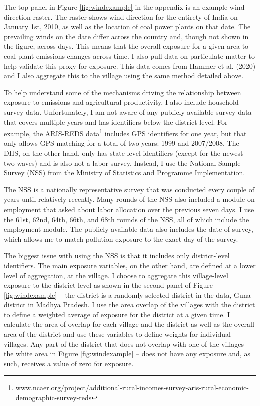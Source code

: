 \documentclass[
]{article}
\begin{document}
The top panel in Figure \ref{fig:windexample} in the appendix is an example wind direction raster. The raster shows wind direction for the entirety of India on January 1st, 2010, as well as the location of coal power plants on that date. The prevailing winds on the date differ across the country and, though not shown in the figure, across days. This means that the overall exposure for a given area to coal plant emissions changes across time. I also pull data on particulate matter to help validate this proxy for exposure. This data comes from Hammer et al. (2020) and I also aggregate this to the village using the same method detailed above.

To help understand some of the mechanisms driving the relationship between exposure to emissions and agricultural productivity, I also include household survey data. Unfortunately, I am not aware of any publicly available survey data that covers multiple years and has identifiers below the district level. For example, the ARIS-REDS data\footnote{www.ncaer.org/project/additional-rural-incomes-survey-aris-rural-economic-demographic-survey-reds} includes GPS identifiers for one year, but that only allows GPS matching for a total of two years: 1999 and 2007/2008. The DHS, on the other hand, only has state-level identifiers (except for the newest two waves) and is also not a labor survey. Instead, I use the National Sample Survey (NSS) from the Ministry of Statistics and Programme Implementation.

The NSS is a nationally representative survey that was conducted every couple of years until relatively recently. Many rounds of the NSS also included a module on employment that asked about labor allocation over the previous seven days. I use the 61st, 62nd, 64th, 66th, and 68th rounds of the NSS, all of which include the employment module. The publicly available data also includes the date of survey, which allows me to match pollution exposure to the exact day of the survey.

The biggest issue with using the NSS is that it includes only district-level identifiers. The main exposure variables, on the other hand, are defined at a lower level of aggregation, at the village. I choose to aggregate this village-level exposure to the district level as shown in the second panel of Figure \ref{fig:windexample} -- the district is a randomly selected district in the data, Guna district in Madhya Pradesh. I use the area overlap of the villages with the district to define a weighted average of exposure for the district at a given time. I calculate the area of overlap for each village and the district as well as the overall area of the district and use these variables to define weights for individual villages. Any part of the district that does not overlap with one of the villages -- the white area in Figure \ref{fig:windexample} -- does not have any exposure and, as such, receives a value of zero for exposure.
\end{document}
